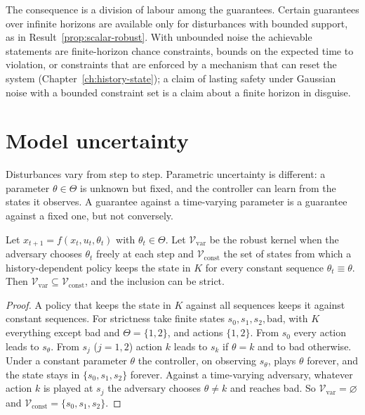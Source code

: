 The consequence is a division of labour among the guarantees. Certain guarantees over infinite horizons are available only for disturbances with bounded support, as in Result~\ref{prop:scalar-robust}. With unbounded noise the achievable statements are finite-horizon chance constraints, bounds on the expected time to violation, or constraints that are enforced by a mechanism that can reset the system (Chapter~\ref{ch:history-state}); a claim of lasting safety under Gaussian noise with a bounded constraint set is a claim about a finite horizon in disguise.

\section{Model uncertainty}

Disturbances vary from step to step. Parametric uncertainty is different: a parameter $\theta\in\Theta$ is unknown but fixed, and the controller can learn from the states it observes. A guarantee against a time-varying parameter is a guarantee against a fixed one, but not conversely.

\begin{newresult}\label{prop:learning}
Let $x_{t+1}=f(x_t,u_t,\theta_t)$ with $\theta_t\in\Theta$. Let $\mathcal V_{\mathrm{var}}$ be the robust kernel when the adversary chooses $\theta_t$ freely at each step and $\mathcal V_{\mathrm{const}}$ the set of states from which a history-dependent policy keeps the state in $K$ for every constant sequence $\theta_t\equiv\theta$. Then $\mathcal V_{\mathrm{var}}\subseteq\mathcal V_{\mathrm{const}}$, and the inclusion can be strict.
\end{newresult}
\begin{proof}
A policy that keeps the state in $K$ against all sequences keeps it against constant sequences. For strictness take finite states $s_0,s_1,s_2,\mathrm{bad}$, with $K$ everything except bad and $\Theta=\{1,2\}$, and actions $\{1,2\}$. From $s_0$ every action leads to $s_\theta$. From $s_j$ ($j=1,2$) action $k$ leads to $s_k$ if $\theta=k$ and to bad otherwise. Under a constant parameter $\theta$ the controller, on observing $s_\theta$, plays $\theta$ forever, and the state stays in $\{s_0,s_1,s_2\}$ forever. Against a time-varying adversary, whatever action $k$ is played at $s_j$ the adversary chooses $\theta\ne k$ and reaches bad. So $\mathcal V_{\mathrm{var}}=\varnothing$ and $\mathcal V_{\mathrm{const}}=\{s_0,s_1,s_2\}$.
\end{proof}

